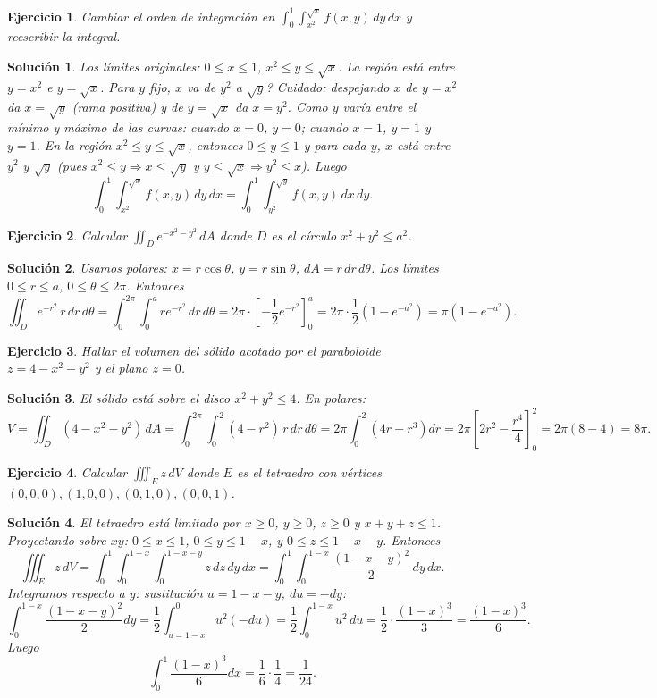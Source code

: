 \documentclass[12pt,spanish]{article}
\newtheorem{ejercicio}{Ejercicio}[section]
\newtheorem{solucion}{Solución}
\begin{document}
\begin{ejercicio}
Cambiar el orden de integración en $\displaystyle\int_0^1\int_{x^2}^{\sqrt{x}} f(x,y)\,dy\,dx$ y reescribir la integral.
\end{ejercicio}
\begin{solucion}
Los límites originales: $0\le x\le1$, $x^2\le y\le\sqrt{x}$. La región está entre $y=x^2$ e $y=\sqrt{x}$. Para $y$ fijo, $x$ va de $y^2$ a $\sqrt{y}$? Cuidado: despejando $x$ de $y=x^2$ da $x=\sqrt{y}$ (rama positiva) y de $y=\sqrt{x}$ da $x=y^2$. Como $y$ varía entre el mínimo y máximo de las curvas: cuando $x=0$, $y=0$; cuando $x=1$, $y=1$ y $y=1$. En la región $x^2\le y\le\sqrt{x}$, entonces $0\le y\le1$ y para cada $y$, $x$ está entre $y^2$ y $\sqrt{y}$ (pues $x^2\le y\Rightarrow x\le\sqrt{y}$ y $y\le\sqrt{x}\Rightarrow y^2\le x$). Luego
\[
\int_0^1\int_{x^2}^{\sqrt{x}} f(x,y)\,dy\,dx = \int_0^1\int_{y^2}^{\sqrt{y}} f(x,y)\,dx\,dy.
\]
\end{solucion}

\begin{ejercicio}
Calcular $\displaystyle\iint_D e^{-x^2-y^2}\,dA$ donde $D$ es el círculo $x^2+y^2\le a^2$.
\end{ejercicio}
\begin{solucion}
Usamos polares: $x=r\cos\theta$, $y=r\sin\theta$, $dA=r\,dr\,d\theta$. Los límites $0\le r\le a$, $0\le\theta\le2\pi$. Entonces
\[
\iint_D e^{-r^2}\,r\,dr\,d\theta = \int_0^{2\pi}\int_0^a r e^{-r^2}\,dr\,d\theta = 2\pi\cdot\left[-\frac12 e^{-r^2}\right]_0^a = 2\pi\cdot\frac12(1-e^{-a^2}) = \pi(1-e^{-a^2}).
\]
\end{solucion}

\begin{ejercicio}
Hallar el volumen del sólido acotado por el paraboloide $z=4-x^2-y^2$ y el plano $z=0$.
\end{ejercicio}
\begin{solucion}
El sólido está sobre el disco $x^2+y^2\le4$. En polares:
\[
V = \iint_D (4-x^2-y^2)\,dA = \int_0^{2\pi}\int_0^2 (4-r^2)\,r\,dr\,d\theta = 2\pi\int_0^2 (4r-r^3)dr = 2\pi\left[2r^2-\frac{r^4}{4}\right]_0^2 = 2\pi(8-4)=8\pi.
\]
\end{solucion}

\begin{ejercicio}
Calcular $\displaystyle\iiint_E z\,dV$ donde $E$ es el tetraedro con vértices $(0,0,0),(1,0,0),(0,1,0),(0,0,1)$.
\end{ejercicio}
\begin{solucion}
El tetraedro está limitado por $x\ge0$, $y\ge0$, $z\ge0$ y $x+y+z\le1$. Proyectando sobre $xy$: $0\le x\le1$, $0\le y\le1-x$, y $0\le z\le1-x-y$. Entonces
\[
\iiint_E z\,dV = \int_0^1\int_0^{1-x}\int_0^{1-x-y} z\,dz\,dy\,dx = \int_0^1\int_0^{1-x} \frac{(1-x-y)^2}{2}\,dy\,dx.
\]
Integramos respecto a $y$: sustitución $u=1-x-y$, $du=-dy$:
\[
\int_0^{1-x} \frac{(1-x-y)^2}{2}dy = \frac12\int_{u=1-x}^{0} u^2(-du) = \frac12\int_0^{1-x} u^2\,du = \frac12\cdot\frac{(1-x)^3}{3} = \frac{(1-x)^3}{6}.
\]
Luego
\[
\int_0^1 \frac{(1-x)^3}{6}dx = \frac16\cdot\frac14 = \frac1{24}.
\]
\end{solucion}
\end{document}
